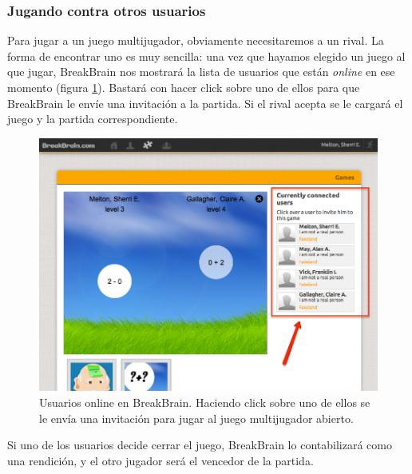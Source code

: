 \subsubsection{Jugando contra otros usuarios}

Para jugar a un juego multijugador, obviamente necesitaremos a un rival. La forma de encontrar uno es muy sencilla: una vez que hayamos elegido un juego al que jugar, BreakBrain nos mostrará la lista de usuarios que están {\it online} en ese momento (figura \ref{fig::online-users}). Bastará con hacer click sobre uno de ellos para que BreakBrain le envíe una invitación a la partida. Si el rival acepta se le cargará el juego y la partida correspondiente.

\begin{figure}[h]
  \begin{center}
    \includegraphics[width=\textwidth]{./images/online-users.png}
  \end{center}  
  \caption[Usuarios online de BreakBrain]{Usuarios online en BreakBrain. Haciendo click sobre uno de ellos se le envía una invitación para jugar al juego multijugador abierto.}
  \label{fig::online-users}
\end{figure}

Si uno de los usuarios decide cerrar el juego, BreakBrain lo contabilizará como una rendición, y el otro jugador será el vencedor de la partida.
